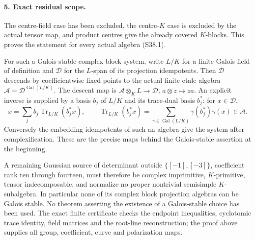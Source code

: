 \paragraph{5. Exact residual scope.}
The centre-field case has been excluded, the centre-\(K\)
case is excluded by the actual tensor map, and product centres
give the already covered \(K\)-blocks. This proves the
statement for every actual algebra (S38.1).

For such a Galois-stable complex block system, write \(L/K\)
for a finite Galois field of definition and \(\mathcal D\)
for the \(L\)-span of its projection idempotents. Then
\(\mathcal D\) descends by coefficientwise fixed points to
the actual finite etale algebra
\(\mathcal A=\mathcal D^{\operatorname{Gal}(L/K)}\).
The descent map is \(\mathcal A\otimes_KL\to\mathcal D\),
\(a\otimes z\mapsto za\). An explicit inverse is supplied
by a basis \(b_j\) of \(L/K\) and its trace-dual basis
\(b_j^*\): for \(x\in\mathcal D\),
\[
 x=\sum_j b_j\operatorname{Tr}_{L/K}(b_j^*x),\qquad
 \operatorname{Tr}_{L/K}(b_j^*x)
   =\sum_{\gamma\in\operatorname{Gal}(L/K)}
                   \gamma(b_j^*)\gamma(x)\in\mathcal A.
\]
Conversely the embedding idempotents of such an algebra give the
system after complexification. These are the precise maps behind
the Galois-stable assertion at the beginning.

A remaining Gaussian source of determinant outside
\(\{[-1],[-3]\}\), coefficient rank ten through fourteen,
must therefore be complex imprimitive, \(K\)-primitive,
tensor indecomposable, and normalize no proper nontrivial
semisimple \(K\)-subalgebra. In particular none of its complex
block projection algebras can be Galois stable. No theorem
asserting the existence of a Galois-stable choice has been used.
The exact finite certificate checks the endpoint inequalities,
cyclotomic trace identity, field matrices and the root-line
reconstruction; the proof above supplies all group, coefficient,
curve and polarization maps.
